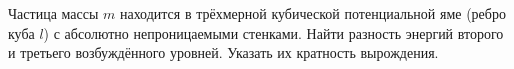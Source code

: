 \documentclass[__main__.tex]{subfiles}
\begin{document}
Частица массы $m$ находится в трёхмерной кубической потенциальной яме (ребро куба $l$) с абсолютно непроницаемыми стенками. Найти разность энергий второго и третьего возбуждённого уровней. Указать их кратность вырождения.\\ 

\end{document}
